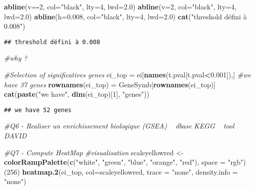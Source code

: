 \documentclass[]{article}
\newenvironment{Shaded}{\begin{snugshade}}{\end{snugshade}}
\newcommand{\KeywordTok}[1]{\textcolor[rgb]{0.13,0.29,0.53}{\textbf{#1}}}
\newcommand{\DataTypeTok}[1]{\textcolor[rgb]{0.13,0.29,0.53}{#1}}
\newcommand{\DecValTok}[1]{\textcolor[rgb]{0.00,0.00,0.81}{#1}}
\newcommand{\FloatTok}[1]{\textcolor[rgb]{0.00,0.00,0.81}{#1}}
\newcommand{\StringTok}[1]{\textcolor[rgb]{0.31,0.60,0.02}{#1}}
\newcommand{\CommentTok}[1]{\textcolor[rgb]{0.56,0.35,0.01}{\textit{#1}}}
\newcommand{\OperatorTok}[1]{\textcolor[rgb]{0.81,0.36,0.00}{\textbf{#1}}}
\newcommand{\NormalTok}[1]{#1}
\begin{document}
\begin{Shaded}
\begin{Highlighting}[]
\KeywordTok{abline}\NormalTok{(}\DataTypeTok{v=}\OperatorTok{-}\DecValTok{2}\NormalTok{, }\DataTypeTok{col=}\StringTok{"black"}\NormalTok{, }\DataTypeTok{lty=}\DecValTok{4}\NormalTok{, }\DataTypeTok{lwd=}\FloatTok{2.0}\NormalTok{)}
\KeywordTok{abline}\NormalTok{(}\DataTypeTok{v=}\DecValTok{2}\NormalTok{, }\DataTypeTok{col=}\StringTok{"black"}\NormalTok{, }\DataTypeTok{lty=}\DecValTok{4}\NormalTok{, }\DataTypeTok{lwd=}\FloatTok{2.0}\NormalTok{)}
\KeywordTok{abline}\NormalTok{(}\DataTypeTok{h=}\FloatTok{0.008}\NormalTok{, }\DataTypeTok{col=}\StringTok{"black"}\NormalTok{, }\DataTypeTok{lty=}\DecValTok{4}\NormalTok{, }\DataTypeTok{lwd=}\FloatTok{2.0}\NormalTok{) }
\KeywordTok{cat}\NormalTok{(}\StringTok{"threshold défini à 0.008"}\NormalTok{)}
\end{Highlighting}
\end{Shaded}

\begin{verbatim}
## threshold défini à 0.008
\end{verbatim}

\begin{Shaded}
\begin{Highlighting}[]
\CommentTok{#why ?}

\CommentTok{#Selection of significatives genes}
\NormalTok{ei_top =}\StringTok{ }\NormalTok{ei[}\KeywordTok{names}\NormalTok{(t.pval[t.pval}\OperatorTok{<}\FloatTok{0.001}\NormalTok{]),] }\CommentTok{#we have 37 genes}
\KeywordTok{rownames}\NormalTok{(ei_top) =}\StringTok{ }\NormalTok{GeneSymb[}\KeywordTok{rownames}\NormalTok{(ei_top)]}
\KeywordTok{cat}\NormalTok{(}\KeywordTok{paste}\NormalTok{(}\StringTok{"we have"}\NormalTok{, }\KeywordTok{dim}\NormalTok{(ei_top)[}\DecValTok{1}\NormalTok{], }\StringTok{"genes"}\NormalTok{))}
\end{Highlighting}
\end{Shaded}

\begin{verbatim}
## we have 52 genes
\end{verbatim}

\begin{Shaded}
\begin{Highlighting}[]
\CommentTok{#Q6 - Realiser un enrichissement biologique (GSEA) ~ dbase KEGG ~ tool DAVID}



\CommentTok{#Q7 - Compute HeatMap}
\CommentTok{#visualisation}
\NormalTok{scaleyellowred <-}\StringTok{ }\KeywordTok{colorRampPalette}\NormalTok{(}\KeywordTok{c}\NormalTok{(}\StringTok{"white"}\NormalTok{, }\StringTok{"green"}\NormalTok{, }\StringTok{"blue"}\NormalTok{, }\StringTok{"orange"}\NormalTok{, }\StringTok{"red"}\NormalTok{), }\DataTypeTok{space =} \StringTok{"rgb"}\NormalTok{)(}\DecValTok{256}\NormalTok{)}
\KeywordTok{heatmap.2}\NormalTok{(ei_top, }\DataTypeTok{col=}\NormalTok{scaleyellowred, }\DataTypeTok{trace =} \StringTok{"none"}\NormalTok{, }\DataTypeTok{density.info =} \StringTok{"none"}\NormalTok{)}
\end{Highlighting}
\end{Shaded}
\end{document}
